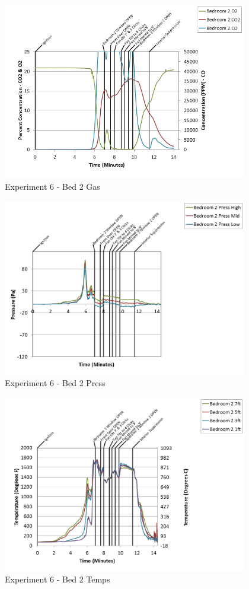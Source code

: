 \documentclass{article}
\begin{document}
\begin{appendices}
\clearpage

\begin{figure}[h!]
	\centering
	\includegraphics[height=3.05in]{0_Images/Results_Charts/Exp_6_Charts/Bed2Gas.png}
	\caption{Experiment 6 - Bed 2 Gas}
\end{figure}


\begin{figure}[h!]
	\centering
	\includegraphics[height=3.05in]{0_Images/Results_Charts/Exp_6_Charts/Bed2Press.png}
	\caption{Experiment 6 - Bed 2 Press}
\end{figure}

\clearpage

\begin{figure}[h!]
	\centering
	\includegraphics[height=3.05in]{0_Images/Results_Charts/Exp_6_Charts/Bed2Temps.png}
	\caption{Experiment 6 - Bed 2 Temps}
\end{figure}



\end{appendices}
\end{document}
